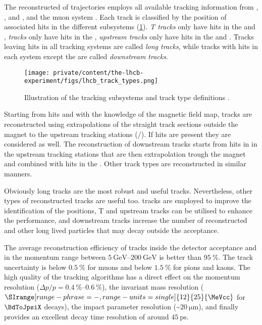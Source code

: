 The reconstructed of trajectories employs all available tracking information
from \VELO, \TT, \IT and \OT, and the muon system \cite{Aaij:2014pwa}. Each
track is classified by the position of associated hits in the different
subsystems
(\cref{fig:lhcb_experiment:tracking:techniques_and_performance:tracktypes}).
\emph{T tracks} only have hits in the \IT and \OT, \emph{\VELO tracks} only have
hits in the
\VELO, \emph{upstream tracks} only have hits in the \VELO and \TT. Tracks
leaving hits in all tracking systems are called \emph{long tracks}, while tracks
with hits in each system except the \VELO are called \emph{downstream tracks}.
%
\begin{figure}[t]
  \texttt{[image: private/content/the-lhcb-experiment/figs/lhcb\_track\_types.png]}
  \caption{
    Illustration of the \LHCb tracking subsystems and track type definitions \cite{Aaij:2014pwa}.
  }
  \label{fig:lhcb_experiment:tracking:techniques_and_performance:tracktypes}
\end{figure}
%
Starting from \VELO hits and with the knowledge of the magnetic field map,
tracks are reconstructed using extrapolations of the straight track sections
outside the magnet to the upstream tracking stations (\IT/\OT). If \TT hits are
present they are considered as well. The reconstruction of downstream tracks
starts from hits in in the upstream tracking stations that are then
extrapolation trough the magnet and combined with hits in the \TT. Other track
types are reconstructed in similar manners. 

Obviously long tracks are the most robust and useful tracks. Nevertheless, other
types of reconstructed tracks are useful too. \VELO tracks are employed to
improve the identification of the \PV positions, T and upstream tracks can be
utilised to enhance the \RICH performance, and downstream tracks increase the
number of reconstructed \KS and other long lived particles that may decay
outside the \VELO acceptance.

The average reconstruction efficiency of tracks inside the detector acceptance
and in the momentum range between 
$\SIrange[range-phrase = -,range-units = single]{5}{200}{\GeV}$ is better than
$\SI{95}{\percent}$. The track uncertainty is below $\SI{0.5}{\percent}$ for
muons and below $\SI{1.5}{\percent}$ for pions and kaons. The high quality of
the tracking algorithms has a direct effect on the momentum resolution ($\Delta
p/p = \SIrange[range-phrase = -,range-units = single]{0.4}{0.6}{\percent}$), the
invariant mass resolution ($\SIrange[range-phrase = -,range-units =single]{12}{25}{\MeVcc}$ 
for $\BdToJpsiX$ decays), the impact parameter resolution (\sim$\SI{20}{\micro\metre}$), 
and finally provides an excellent decay time resolution of around
$\SI{45}{\ps}$.

